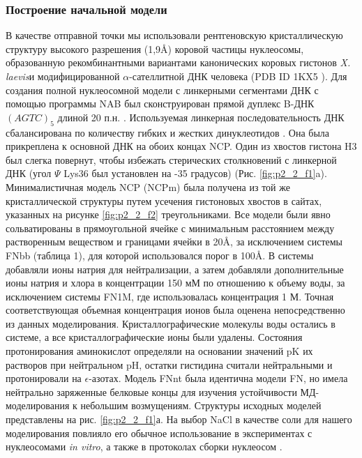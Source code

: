 \subsubsection{Построение начальной модели}
    В качестве отправной точки мы использовали рентгеновскую кристаллическую структуру высокого разрешения (1,9\AA) коровой частицы нуклеосомы, образованную рекомбинантными вариантами канонических коровых гистонов \textit{X. laevis}и модифицированной $\alpha$-сателлитной ДНК человека (PDB ID 1KX5 \cite{davey_solvent_2002}). Для создания полной нуклеосомной модели с линкерными сегментами ДНК с помощью программы NAB был сконструирован прямой дуплекс B-ДНК $(AGTC)_5$ длиной 20 п.н. \cite{macke_thomas_modeling_1997}. Используемая линкерная последовательность ДНК сбалансирована по количеству гибких и жестких динуклеотидов \cite{olson_dna_1998}. Она была прикреплена к основной ДНК на обоих концах NCP. Один из хвостов гистона H3 был слегка повернут, чтобы избежать стерических столкновений с линкерной ДНК (угол $\Psi$ Lys36 был установлен на -35 градусов) (Рис. \ref{fig:p2_2_f1}a). Минималистичная модель NCP (NCPm) была получена из той же кристаллической структуры путем усечения гистоновых хвостов в сайтах, указанных на рисунке \ref{fig:p2_2_f2} треугольниками. Все модели были явно сольватированы в прямоугольной ячейке с минимальным расстоянием между растворенным веществом и границами ячейки в 20\AA, за исключением системы FNbb (таблица 1), для которой использовался порог в 100\AA. В системы добавляли ионы натрия для нейтрализации, а затем добавляли дополнительные ионы натрия и хлора в концентрации 150 мМ по отношению к объему воды, за исключением системы FN1M, где использовалась концентрация 1 М. Точная соответствующая объемная концентрация ионов была оценена непосредственно из данных моделирования. Кристаллографические молекулы воды остались в системе, а все кристаллографические ионы были удалены. Состояния протонирования аминокислот определяли на основании значений pK их растворов при нейтральном pH, остатки гистидина считали нейтральными и протонировали на $\epsilon$-азотах. Модель FNnt была идентична модели FN, но имела нейтрально заряженные белковые концы для изучения устойчивости МД-моделирования к небольшим возмущениям. Структуры исходных моделей представлены на рис. \ref{fig:p2_2_f1}а. На выбор NaCl в качестве соли для нашего моделирования повлияло его обычное использование в экспериментах с нуклеосомами \textit{in vitro}, а также в протоколах сборки нуклеосом \cite{dyer_reconstitution_2004}.

